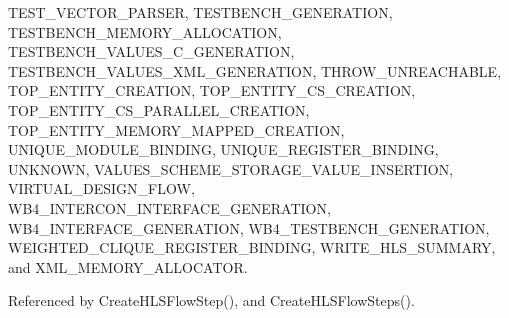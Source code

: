 T\+E\+S\+T\+\_\+\+V\+E\+C\+T\+O\+R\+\_\+\+P\+A\+R\+S\+ER, T\+E\+S\+T\+B\+E\+N\+C\+H\+\_\+\+G\+E\+N\+E\+R\+A\+T\+I\+ON, T\+E\+S\+T\+B\+E\+N\+C\+H\+\_\+\+M\+E\+M\+O\+R\+Y\+\_\+\+A\+L\+L\+O\+C\+A\+T\+I\+ON, T\+E\+S\+T\+B\+E\+N\+C\+H\+\_\+\+V\+A\+L\+U\+E\+S\+\_\+\+C\+\_\+\+G\+E\+N\+E\+R\+A\+T\+I\+ON, T\+E\+S\+T\+B\+E\+N\+C\+H\+\_\+\+V\+A\+L\+U\+E\+S\+\_\+\+X\+M\+L\+\_\+\+G\+E\+N\+E\+R\+A\+T\+I\+ON, T\+H\+R\+O\+W\+\_\+\+U\+N\+R\+E\+A\+C\+H\+A\+B\+LE, T\+O\+P\+\_\+\+E\+N\+T\+I\+T\+Y\+\_\+\+C\+R\+E\+A\+T\+I\+ON, T\+O\+P\+\_\+\+E\+N\+T\+I\+T\+Y\+\_\+\+C\+S\+\_\+\+C\+R\+E\+A\+T\+I\+ON, T\+O\+P\+\_\+\+E\+N\+T\+I\+T\+Y\+\_\+\+C\+S\+\_\+\+P\+A\+R\+A\+L\+L\+E\+L\+\_\+\+C\+R\+E\+A\+T\+I\+ON, T\+O\+P\+\_\+\+E\+N\+T\+I\+T\+Y\+\_\+\+M\+E\+M\+O\+R\+Y\+\_\+\+M\+A\+P\+P\+E\+D\+\_\+\+C\+R\+E\+A\+T\+I\+ON, U\+N\+I\+Q\+U\+E\+\_\+\+M\+O\+D\+U\+L\+E\+\_\+\+B\+I\+N\+D\+I\+NG, U\+N\+I\+Q\+U\+E\+\_\+\+R\+E\+G\+I\+S\+T\+E\+R\+\_\+\+B\+I\+N\+D\+I\+NG, U\+N\+K\+N\+O\+WN, V\+A\+L\+U\+E\+S\+\_\+\+S\+C\+H\+E\+M\+E\+\_\+\+S\+T\+O\+R\+A\+G\+E\+\_\+\+V\+A\+L\+U\+E\+\_\+\+I\+N\+S\+E\+R\+T\+I\+ON, V\+I\+R\+T\+U\+A\+L\+\_\+\+D\+E\+S\+I\+G\+N\+\_\+\+F\+L\+OW, W\+B4\+\_\+\+I\+N\+T\+E\+R\+C\+O\+N\+\_\+\+I\+N\+T\+E\+R\+F\+A\+C\+E\+\_\+\+G\+E\+N\+E\+R\+A\+T\+I\+ON, W\+B4\+\_\+\+I\+N\+T\+E\+R\+F\+A\+C\+E\+\_\+\+G\+E\+N\+E\+R\+A\+T\+I\+ON, W\+B4\+\_\+\+T\+E\+S\+T\+B\+E\+N\+C\+H\+\_\+\+G\+E\+N\+E\+R\+A\+T\+I\+ON, W\+E\+I\+G\+H\+T\+E\+D\+\_\+\+C\+L\+I\+Q\+U\+E\+\_\+\+R\+E\+G\+I\+S\+T\+E\+R\+\_\+\+B\+I\+N\+D\+I\+NG, W\+R\+I\+T\+E\+\_\+\+H\+L\+S\+\_\+\+S\+U\+M\+M\+A\+RY, and X\+M\+L\+\_\+\+M\+E\+M\+O\+R\+Y\+\_\+\+A\+L\+L\+O\+C\+A\+T\+OR.



Referenced by Create\+H\+L\+S\+Flow\+Step(), and Create\+H\+L\+S\+Flow\+Steps().

